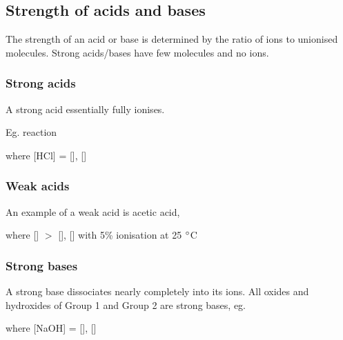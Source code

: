 		\begin{center}
		\end{center}

	\subsection{Strength of acids and bases}

		The strength of an acid or base is determined by the ratio of ions to unionised molecules. Strong acids/bases have few molecules and no ions.

		\subsubsection{Strong acids}
		
			A strong acid essentially fully ionises.

			Eg.  reaction

			\begin{center}
			\end{center}
			
			where [HCl] = [], []

		\subsubsection{Weak acids}
			
			An example of a weak acid is acetic acid, 

			\begin{center}
			\end{center}

			where [] $>$ [], [] with 5\% ionisation at 25 $\degree$C

		\subsubsection{Strong bases}
			
			A strong base dissociates nearly completely into its ions. All oxides and hydroxides of Group 1 and Group 2 are strong bases, eg. 

			\begin{center}
			\end{center}

			where [NaOH] = [], []

